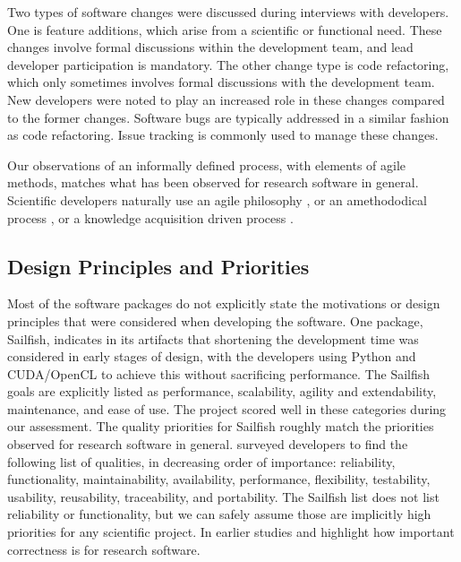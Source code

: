 \documentclass[final, 3p, times, authoryear]{elsarticle}
\begin{document}
Two types of software changes were discussed during interviews with developers.
One is feature additions, which arise from a scientific or functional need.
These changes involve formal discussions within the development team, and lead
developer participation is mandatory. The other change type is code refactoring,
which only sometimes involves formal discussions with the development team. New
developers were noted to play an increased role in these changes compared to the
former changes. Software bugs are typically addressed in a similar fashion as
code refactoring.  Issue tracking is commonly used to manage these changes.

Our observations of an informally defined process, with elements of agile
methods, matches what has been observed for research software in general.
Scientific developers naturally use an agile philosophy \citep{AckroydEtAl2008,
CarverEtAl2007, EasterbrookAndJohns2009, Segal2005, HeatonAndCarver2015}, or an
amethododical process \citep{Kelly2013}, or a knowledge acquisition driven
process \citep{Kelly2015}.

\subsection{Design Principles and Priorities} \label{Sec_DesPrincipAndPriorities}

Most of the software packages do not explicitly state the motivations or design
principles that were considered when developing the software. One package,
Sailfish, indicates in its artifacts that shortening the development time was
considered in early stages of design, with the developers using Python and
CUDA/OpenCL to achieve this without sacrificing performance. The Sailfish goals
are explicitly listed as performance, scalability, agility and extendability,
maintenance, and ease of use. The project scored well in these categories during
our assessment.  The quality priorities for Sailfish roughly match the
priorities observed for research software in general.
\citet{Nguyen-HoanEtAl2010} surveyed developers to find the following list of
qualities, in decreasing order of importance: reliability, functionality,
maintainability, availability, performance, flexibility, testability, usability,
reusability, traceability, and portability. The Sailfish list does not list
reliability or functionality, but we can safely assume those are implicitly high
priorities for any scientific project.  In earlier studies
\citet{KellyAndSanders2008} and \citet{CarverEtAl2007} highlight how important
correctness is for research software.
\end{document}

